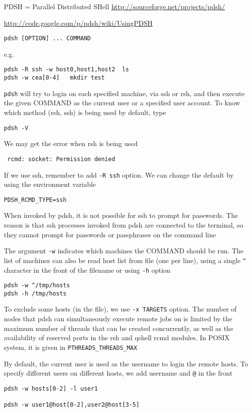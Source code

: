 PDSH = Parallel Distributed SHell \url{http://sourceforge.net/projects/pdsh/}

\url{http://code.google.com/p/pdsh/wiki/UsingPDSH}
\begin{verbatim}
pdsh [OPTION] ... COMMAND
\end{verbatim}
e.g.
\begin{verbatim}
pdsh -R ssh -w host0,host1,host2  ls
pdsh -w cea[0-4]   mkdir test
\end{verbatim}

\verb!pdsh! will try to login on each specified machine, via ssh or rsh, and
then execute the given COMMAND as the current user or a specified user account. 
To know which method (rsh, ssh) is being used by default, type
\begin{verbatim}
pdsh -V
\end{verbatim}
We may get the error when rsh is being used
\begin{verbatim}
 rcmd: socket: Permission denied
\end{verbatim}
If we use ssh, remember to add \verb!-R ssh! option. We can change the default
by using the environment variable
\begin{verbatim}
PDSH_RCMD_TYPE=ssh
\end{verbatim}
When invoked by pdsh, it is not possible for ssh to prompt for passwords. The
reason is that  ssh processes invoked from pdsh are
connected to the terminal, so they cannot prompt for passwords or
passphrases on the command line

The argument \verb!-w! indicates which machines the COMMAND should be run.
The list of machines can also be read host list from file (one per line), using
a single \verb!^! character in the front of the filename or using \verb!-h!
option
\begin{verbatim}
pdsh -w ^/tmp/hosts
pdsh -h /tmp/hosts
\end{verbatim}
To exclude some hosts (in the file), we use \verb!-x TARGETS! option.  The
number of nodes that pdsh can simultaneously execute remote jobs on  is limited
by the  maximum  number  of  threads  that  can  be  created  concurrently,  as well as the availability of reserved ports in the rsh
       and qshell rcmd modules. In POSIX system, it is given in
       \verb!PTHREADS_THREADS_MAX!

By default, the current user is used as the username to login the remote hosts.
To specify different users on different hosts, we add username and \verb!@! in
the front
\begin{verbatim}
pdsh -w hosts[0-2] -l user1

pdsh -w user1@host[0-2],user2@host[3-5]
\end{verbatim}

